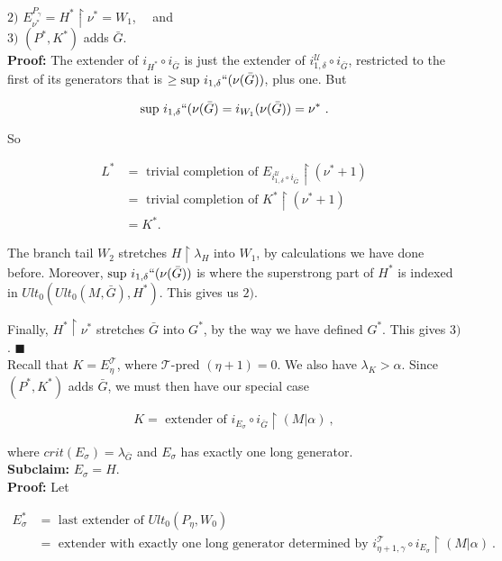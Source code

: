\documentclass[12pt]{article}
\begin{document}
\indent \indent $2)$ $E_{\nu^*}^{P_\gamma} = H^* \restriction \nu^* = W_1$, \ \ and\\

\indent \indent $3)$ $(P^* , K^*)$ adds $\bar{G}$.\\

\textbf{Proof:} The extender of $i_{H^*} \circ i_{\bar{G}}$ is just the extender of $i_{1, \delta}^{\mathscr{U}} \circ i_{\bar{G}}$, restricted to the first of its generators that is $\geq \text{sup } i_{1, \delta} ``( \nu (\bar{G}))$, plus one. But

\[
\text{sup } i_{1, \delta} `` (\nu (\bar{G}) = i_{W_1} (\nu (\bar{G})) = \nu^* \ .
\]

So

\[
\begin{split}
L^* & = \text{ trivial completion of } E_{i_{1, \delta}^{\mathscr{U}} \circ i_{\bar{G}}} \restriction (\nu^* + 1 )\\
& = \text{ trivial completion of } K^* \restriction (\nu^* + 1 )\\
& = K^*.
\end{split}
\]

The branch tail $W_2$ stretches $H \restriction \lambda_H$ into $W_1$, by calculations we have done before.  Moreover, $\text{sup } i_{1, \delta } `` (\nu(\bar{G}))$ is where the superstrong part of $H^*$ is indexed in $Ult_0 ( Ult_0 (M, \bar{G}), H^*)$.  This gives us $2)$.

Finally, $H^* \restriction \nu^*$ stretches $\bar{G}$ into $G^*$, by the way we have defined $G^*$.  This gives $3)$. $\blacksquare$\\

Recall that $K = E_\eta^{\mathscr{T}}$, where $\mathscr{T}$-pred $(\eta + 1) = 0$.  We also have $\lambda_K > \alpha$.  Since $(P^* , K^* )$ adds $\bar{G}$, we must then have our special case

\[
K = \text{ extender of } i_{E_\sigma} \circ i_{\bar{G}} \restriction (M | \alpha ) \ ,
\]

where $crit(E_\sigma ) = \lambda_{\bar{G}}$ and $E_\sigma$ has exactly one long generator.\\

\textbf{Subclaim:} $E_\sigma = H$.\\

\textbf{Proof:} Let

\[
\begin{split}
E_\sigma^* & = \text{ last extender of } Ult_0 (P_\eta , W_0 )\\
& = \text{ extender with exactly one long generator determined by } i_{\eta + 1 , \gamma}^{\mathscr{T}} \circ i_{E_\sigma} \restriction (M | \alpha ) \ .
\end{split}
\]
\end{document}
